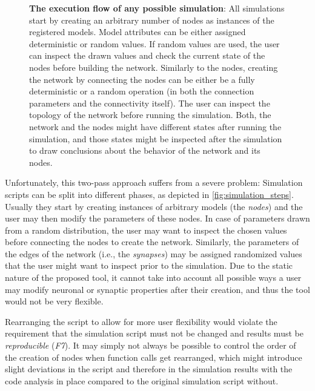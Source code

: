 \begin{figure}[ht!]
    \caption{\textbf{The execution flow of any possible simulation}: All simulations start by creating an arbitrary number of nodes as instances of the registered models. Model attributes can be either assigned deterministic or random values. If random values are used, the user can inspect the drawn values and check the current state of the nodes before building the network. Similarly to the nodes, creating the network by connecting the nodes can be either be a fully deterministic or a random operation (in both the connection parameters and the connectivity itself). The user can inspect the topology of the network before running the simulation. Both, the network and the nodes might have different states after running the simulation, and those states might be inspected after the simulation to draw conclusions about the behavior of the network and its nodes.}
    \label{fig:simulation_steps}
\end{figure}



Unfortunately, this two-pass approach suffers from a severe problem: Simulation scripts can be split into different phases, as depicted in \autoref{fig:simulation_steps}. Usually they start by creating instances of arbitrary models (the \emph{nodes}) and the user may then modify the parameters of these nodes. In case of parameters drawn from a random distribution, the user may want to inspect the chosen values before connecting the nodes to create the network. Similarly, the parameters of the edges of the network (i.e., the \emph{synapses}) may be assigned randomized values that the user might want to inspect prior to the simulation. Due to the static nature of the proposed tool, it cannot take into account all possible ways a user may modify neuronal or synaptic properties after their creation, and thus the tool would not be very flexible.

Rearranging the script to allow for more user flexibility would violate the requirement that the simulation script must not be changed and results must be \emph{reproducible} (\emph{F7}). It may simply not always be possible to control the order of the creation of nodes when function calls get rearranged, which might introduce slight deviations in the script and therefore in the simulation results with the code analysis in place compared to the original simulation script without.

